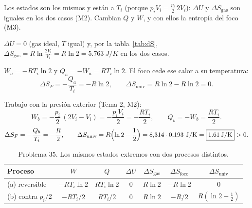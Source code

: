 \begin{resolucion}
\idea Los estados son los mismos y están a $T_i$ (porque $p_iV_i=\tfrac{p_i}{2}\,2V_i$): $\Delta U$ y $\Delta S_{\mathrm{gas}}$
son iguales en los dos casos (M2). Cambian $Q$ y $W$, y con ellos la entropía del foco (M3).

 $\Delta U=0$ (gas ideal, $T$ igual) y, por la tabla~\ref{tab:dS},
$\Delta S_{\mathrm{gas}}=R\ln\frac{2V_i}{V_i}=R\ln2=\SI{5,763}{J/K}$ en los dos casos.

$W_a=-RT_i\ln2$ y $Q_a=-W_a=RT_i\ln2$. El foco cede ese calor a su temperatura:
\[
  \Delta S_F=-\frac{Q_a}{T_i}=-R\ln2,\qquad \Delta S_{\mathrm{univ}}=R\ln2-R\ln2=\boxed{0}.
\]

 Trabajo con la presión exterior (Tema 2, M2):
\[
  W_b=-\frac{p_i}{2}\,(2V_i-V_i)=-\frac{p_iV_i}{2}=-\frac{RT_i}{2},\qquad Q_b=-W_b=\frac{RT_i}{2}.
\]
\[
  \Delta S_F=-\frac{Q_b}{T_i}=-\frac R2,\qquad
  \Delta S_{\mathrm{univ}}=R\Bigl(\ln2-\frac12\Bigr)=8{,}314\cdot0{,}193\ \mathrm{J/K}=\boxed{\SI{1,61}{J/K}}>0 .
\]
\end{resolucion}

\begin{table}[H]
\centering
\caption{Problema 35. Los mismos estados extremos con dos procesos distintos.}
\small
\renewcommand{\arraystretch}{1.5}
\begin{tabular}{lcccccc}
\toprule
Proceso & $W$ & $Q$ & $\Delta U$ & $\Delta S_{\mathrm{gas}}$ & $\Delta S_{\mathrm{foco}}$ & $\Delta S_{\mathrm{univ}}$\\
\midrule
(a) reversible & $-RT_i\ln2$ & $RT_i\ln2$ & 0 & $R\ln2$ & $-R\ln2$ & $0$\\
(b) contra $p_i/2$ & $-RT_i/2$ & $RT_i/2$ & 0 & $R\ln2$ & $-R/2$ & $R(\ln2-\tfrac12)$\\
\bottomrule
\end{tabular}
\end{table}


